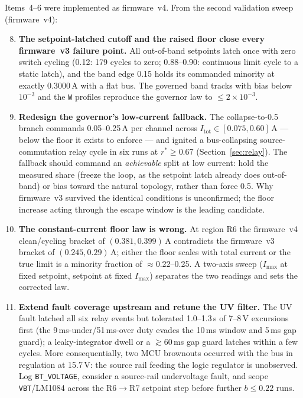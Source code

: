 \documentclass[11pt]{article}
\newcommand{\code}[1]{\texttt{#1}}
\begin{document}
Items~4--6 were implemented as firmware~v4. From the second validation sweep
(firmware~v4):

\begin{enumerate}
\setcounter{enumi}{7}
\item \textbf{The setpoint-latched cutoff and the raised floor close every
firmware~v3 failure point.} All out-of-band setpoints latch once with zero
switch cycling (0.12: 179 cycles to zero; 0.88--0.90: continuous limit cycle to
a static latch), and the band edge 0.15 holds its commanded minority at exactly
0.3000\,A with a flat bus. The governed band tracks with bias below $10^{-3}$
and the \code{W} profiles reproduce the governor law to $\leq 2\times10^{-3}$.
\item \textbf{Redesign the governor's low-current fallback.} The
collapse-to-0.5 branch commands 0.05--0.25\,A per channel across
$I_\mathrm{tot} \in [0.075, 0.60]$\,A --- below the floor it exists to enforce ---
and ignited a bus-collapsing source-commutation relay cycle in six runs at
$r^\ast \geq 0.67$ (Section~\ref{sec:relay}). The fallback should command an
\emph{achievable} split at low current: hold the measured share (freeze the
loop, as the setpoint latch already does out-of-band) or bias toward the natural
topology, rather than force 0.5. Why firmware~v3 survived the identical
conditions is unconfirmed; the floor increase acting through the escape window
is the leading candidate.
\item \textbf{The constant-current floor law is wrong.} At region R6 the
firmware~v4 clean/cycling bracket of $(0.381, 0.399)$\,A contradicts the
firmware~v3 bracket of $(0.245, 0.29)$\,A; either the floor scales with total
current or the true limit is a minority fraction of $\approx$0.22--0.25. A
two-axis sweep ($I_\mathrm{max}$ at fixed setpoint, setpoint at fixed
$I_\mathrm{max}$) separates the two readings and sets the corrected law.
\item \textbf{Extend fault coverage upstream and retune the UV filter.} The UV
fault latched all six relay events but tolerated 1.0--1.3\,s of 7--8\,V
excursions first (the 9\,ms-under/51\,ms-over duty evades the 10\,ms window and
5\,ms gap guard); a leaky-integrator dwell or a $\gtrsim$60\,ms gap guard
latches within a few cycles. More consequentially, two MCU brownouts occurred
with the bus in regulation at 15.7\,V: the source rail feeding the logic
regulator is unobserved. Log \code{BT\_VOLTAGE}, consider a source-rail
undervoltage fault, and scope \code{VBT}/LM1084 across the R6$\to$R7 setpoint
step before further $b \leq 0.22$ runs.
\end{enumerate}
\end{document}
